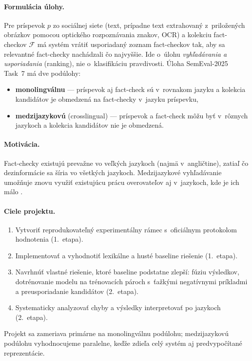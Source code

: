 \documentclass[11pt,a4paper]{article}
\begin{document}
\paragraph{Formulácia úlohy.}
Pre príspevok $p$ zo sociálnej siete (text, prípadne text extrahovaný z~priložených obrázkov pomocou optického rozpoznávania znakov, OCR) a kolekciu fact-checkov $\mathcal{F}$ má systém vrátiť usporiadaný zoznam fact-checkov tak, aby sa relevantné fact-checky nachádzali čo najvyššie.
Ide o~úlohu \emph{vyhľadávania a usporiadania} (ranking), nie o~klasifikáciu pravdivosti.
Úloha SemEval-2025 Task~7 \citep{peng-etal-2025-semeval} má dve podúlohy:
\begin{itemize}
  \item \textbf{monolingválnu} --- príspevok aj fact-check sú v~rovnakom jazyku a kolekcia kandidátov je obmedzená na fact-checky v~jazyku príspevku,
  \item \textbf{medzijazykovú} (crosslingual) --- príspevok a fact-check môžu byť v~rôznych jazykoch a kolekcia kandidátov nie je obmedzená.
\end{itemize}

\paragraph{Motivácia.}
Fact-checky existujú prevažne vo veľkých jazykoch (najmä v~angličtine), zatiaľ čo dezinformácie sa šíria vo všetkých jazykoch.
Medzijazykové vyhľadávanie umožňuje znovu využiť existujúcu prácu overovateľov aj v~jazykoch, kde je ich málo \citep{pikuliak-etal-2023-multilingual, peng-etal-2025-semeval}.

\paragraph{Ciele projektu.}
\begin{enumerate}
  \item Vytvoriť reprodukovateľný experimentálny rámec s~oficiálnym protokolom hodnotenia (1.~etapa).
  \item Implementovať a vyhodnotiť lexikálne a husté baseline riešenie (1.~etapa).
  \item Navrhnúť vlastné riešenie, ktoré baseline podstatne zlepší: fúziu výsledkov, dotrénovanie modelu na trénovacích pároch s~ťažkými negatívnymi príkladmi a preusporiadanie kandidátov (2.~etapa).
  \item Systematicky analyzovať chyby a výsledky interpretovať po jazykoch (2.~etapa).
\end{enumerate}
Projekt sa zameriava primárne na monolingválnu podúlohu; medzijazykovú podúlohu vyhodnocujeme paralelne, keďže zdieľa celý systém aj predvypočítané reprezentácie.
\end{document}
